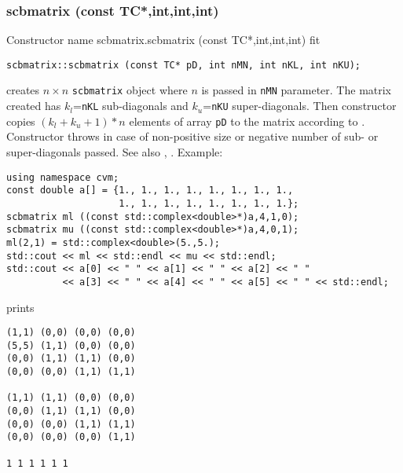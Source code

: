 \subsubsection{scbmatrix (const TC*,int,int,int)}
Constructor%
\pdfdest name {scbmatrix.scbmatrix (const TC*,int,int,int)} fit
\begin{verbatim}
scbmatrix::scbmatrix (const TC* pD, int nMN, int nKL, int nKU);
\end{verbatim}
creates  $n\times n$ \verb"scbmatrix" object where $n$ is passed in
\verb"nMN" parameter. The matrix created has $k_l$=\verb"nKL" 
sub-diagonals and $k_u$=\verb"nKU" super-diagonals.
Then constructor copies $(k_l + k_u + 1)*n$ elements of array \verb"pD" to the 
matrix according to .
Constructor throws  
in case of non-positive size or negative number of sub- or super-diagonals 
passed.
See also ,
.
Example:
\begin{Verbatim}
using namespace cvm;
const double a[] = {1., 1., 1., 1., 1., 1., 1., 1., 
                    1., 1., 1., 1., 1., 1., 1., 1.};
scbmatrix ml ((const std::complex<double>*)a,4,1,0);
scbmatrix mu ((const std::complex<double>*)a,4,0,1);
ml(2,1) = std::complex<double>(5.,5.);
std::cout << ml << std::endl << mu << std::endl;
std::cout << a[0] << " " << a[1] << " " << a[2] << " "
          << a[3] << " " << a[4] << " " << a[5] << " " << std::endl;
\end{Verbatim}
prints
\begin{Verbatim}
(1,1) (0,0) (0,0) (0,0)
(5,5) (1,1) (0,0) (0,0)
(0,0) (1,1) (1,1) (0,0)
(0,0) (0,0) (1,1) (1,1)

(1,1) (1,1) (0,0) (0,0)
(0,0) (1,1) (1,1) (0,0)
(0,0) (0,0) (1,1) (1,1)
(0,0) (0,0) (0,0) (1,1)

1 1 1 1 1 1
\end{Verbatim}
\newpage


